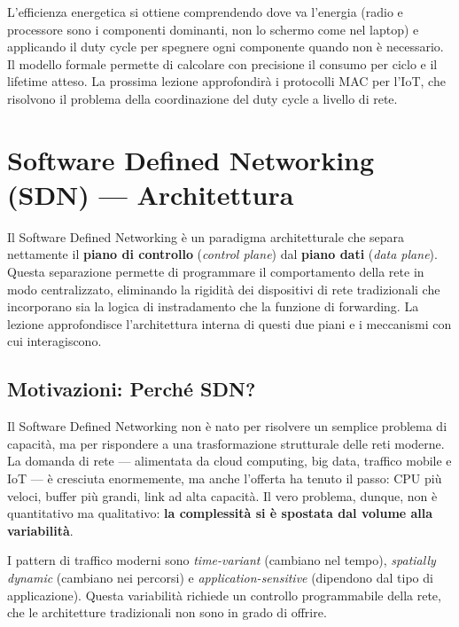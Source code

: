 \documentclass[
  italian,
  openany]{book}
\begin{document}
L'efficienza energetica si ottiene comprendendo dove va l'energia (radio
e processore sono i componenti dominanti, non lo schermo come nel
laptop) e applicando il duty cycle per spegnere ogni componente quando
non è necessario. Il modello formale permette di calcolare con
precisione il consumo per ciclo e il lifetime atteso. La prossima
lezione approfondirà i protocolli MAC per l'IoT, che risolvono il
problema della coordinazione del duty cycle a livello di rete.

\newpage

\chapter{Software Defined Networking (SDN) ---
Architettura}\label{software-defined-networking-sdn-architettura}

Il Software Defined Networking è un paradigma architetturale che separa
nettamente il \textbf{piano di controllo} (\emph{control plane}) dal
\textbf{piano dati} (\emph{data plane}). Questa separazione permette di
programmare il comportamento della rete in modo centralizzato,
eliminando la rigidità dei dispositivi di rete tradizionali che
incorporano sia la logica di instradamento che la funzione di
forwarding. La lezione approfondisce l'architettura interna di questi
due piani e i meccanismi con cui interagiscono.

\section{Motivazioni: Perché SDN?}\label{motivazioni-perchuxe9-sdn}

Il Software Defined Networking non è nato per risolvere un semplice
problema di capacità, ma per rispondere a una trasformazione strutturale
delle reti moderne. La domanda di rete --- alimentata da cloud
computing, big data, traffico mobile e IoT --- è cresciuta enormemente,
ma anche l'offerta ha tenuto il passo: CPU più veloci, buffer più
grandi, link ad alta capacità. Il vero problema, dunque, non è
quantitativo ma qualitativo: \textbf{la complessità si è spostata dal
volume alla variabilità}.

I pattern di traffico moderni sono \emph{time-variant} (cambiano nel
tempo), \emph{spatially dynamic} (cambiano nei percorsi) e
\emph{application-sensitive} (dipendono dal tipo di applicazione).
Questa variabilità richiede un controllo programmabile della rete, che
le architetture tradizionali non sono in grado di offrire.
\end{document}
